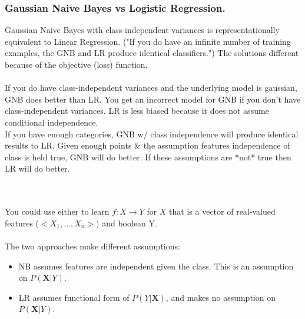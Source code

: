 \subsubsection{Gaussian Naive Bayes vs Logistic Regression.}
Gaussian Naive Bayes with class-independent variances is representationally equivalent to Linear Regression.
("If you do have an infinite number of training examples, the GNB and LR produce identical classifiers.")  %
The solutions different because of the objective (loss) function.  \hfill \\
\hfill \\

If you do have class-independent variances and the underlying model is gaussian, GNB does better than LR.
You get an incorrect model for GNB if you don't have class-independent variances.  %
LR is less biased because it does not assume conditional independence.  %
\hfill \\

If you have enough categories, GNB w/ class independence will produce identical results to LR.  %
Given enough points \& the assumption features independence of class is held true, GNB will do better. 
If these assumptions are *not* true then LR will do better.

 \hfill \\  \hfill \\

You could use either to learn $ f: X \rightarrow Y$ for $X$ that is a vector of real-valued features ($< X_1, \dots, X_n >$) and boolean Y. \hfill \\ \hfill \\

The two approaches make different assumptions:   \hfill \\
\begin{itemize}
	\item NB assumes features are independent given the class.  This is an assumption on $P(\bm{X} | Y)$.
	\item LR assumes functional form of $P(Y|\bm{X})$, and makes no assumption on $P(\bm{X} | Y)$.
\end{itemize}

